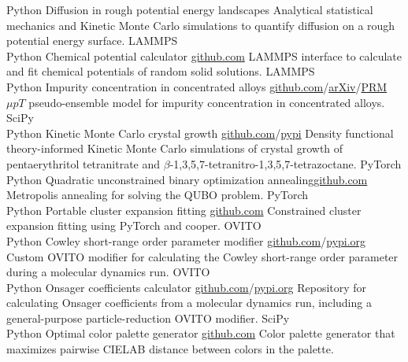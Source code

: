 \documentclass[9pt]{developercv} %
\begin{document}
\begin{entrylist}
    \entry
        {Python}
        {Diffusion in rough potential energy landscapes}
        {}
        {Analytical statistical mechanics and Kinetic Monte Carlo simulations to quantify diffusion on a rough potential energy surface.}
    \entry
        {LAMMPS \\ Python}
        {Chemical potential calculator}
        {\href{https://github.com/jwjeffr/chemical_potential_bulk}{github.com}}
        {LAMMPS interface to calculate and fit chemical potentials of random solid solutions.}
    \entry
		{LAMMPS \\ Python}
		{Impurity concentration in concentrated alloys}
        {\href{https://github.com/jwjeffr/vacancy_concentration}{github.com}/\href{https://arxiv.org/abs/2402.07324}{arXiv}/\href{https://doi.org/10.1103/PhysRevMaterials.9.033803}{PRM}}
		{$\mu pT$ pseudo-ensemble model for impurity concentration in concentrated alloys.}
    \entry
        {SciPy \\ Python}
		{Kinetic Monte Carlo crystal growth}
        {\href{https://github.com/jwjeffr/pytorch_kmc}{github.com}/\href{https://pypi.org/project/cgkmc/}{pypi}}
		{Density functional theory-informed Kinetic Monte Carlo simulations of crystal growth of pentaerythritol tetranitrate and $\beta$-1,3,5,7-tetranitro-1,3,5,7-tetrazoctane.}
    \entry
		{PyTorch \\ Python}
		{Quadratic unconstrained binary optimization annealing}{\href{https://github.com/jwjeffr/pytorch_annealing}{github.com}}
		{Metropolis annealing for solving the QUBO problem.}
    \entry
		{PyTorch \\ Python}
		{Portable cluster expansion fitting}
		{\href{https://github.com/jwjeffr/cluster_expansion_pytorch}{github.com}}
		{Constrained cluster expansion fitting using PyTorch and cooper.}
    \entry
		{OVITO \\ Python}
		{Cowley short-range order parameter modifier}
		{\href{https://github.com/jwjeffr/cowley_sro_parameters}{github.com}/\href{https://pypi.org/project/cowley-sro-parameters/}{pypi.org}}
		{Custom OVITO modifier for calculating the Cowley short-range order parameter during a molecular dynamics run.}
    \entry
		{OVITO \\ Python}
		{Onsager coefficients calculator}
		{\href{https://github.com/jwjeffr/onsager_coefficients/}{github.com}/\href{https://pypi.org/project/cowley-sro-parameters/}{pypi.org}}
		{Repository for calculating Onsager coefficients from a molecular dynamics run, including a general-purpose particle-reduction OVITO modifier.}
    \entry
		{SciPy \\ Python}
		{Optimal color palette generator}
		{\href{https://github.com/jwjeffr/optcolpal}{github.com}}
		{Color palette generator that maximizes pairwise CIELAB distance between colors in the palette.}
\end{entrylist}
\end{document}
